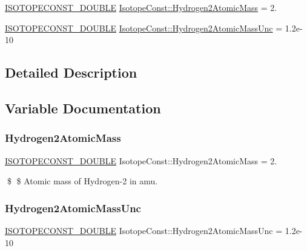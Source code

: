 \begin{DoxyCompactItemize}
\item 
\mbox{\hyperlink{group___isotope_const-_macros_ga8f45a7272ce02c0b4c65c44636ed719a}{I\+S\+O\+T\+O\+P\+E\+C\+O\+N\+S\+T\+\_\+\+D\+O\+U\+B\+LE}} \mbox{\hyperlink{group___isotope_const-_hydrogen-_h2_ga01800289e19608d2faed592d58b2feef}{Isotope\+Const\+::\+Hydrogen2\+Atomic\+Mass}} = 2.
\item 
\mbox{\hyperlink{group___isotope_const-_macros_ga8f45a7272ce02c0b4c65c44636ed719a}{I\+S\+O\+T\+O\+P\+E\+C\+O\+N\+S\+T\+\_\+\+D\+O\+U\+B\+LE}} \mbox{\hyperlink{group___isotope_const-_hydrogen-_h2_ga5e8250090a221fe05dd08a5556946386}{Isotope\+Const\+::\+Hydrogen2\+Atomic\+Mass\+Unc}} = 1.\+2e-\/10
\end{DoxyCompactItemize}


\subsection{Detailed Description}


\subsection{Variable Documentation}
\mbox{\label{group___isotope_const-_hydrogen-_h2_ga01800289e19608d2faed592d58b2feef}} 
\subsubsection{\texorpdfstring{Hydrogen2\+Atomic\+Mass}{Hydrogen2AtomicMass}}
{\footnotesize\ttfamily \mbox{\hyperlink{group___isotope_const-_macros_ga8f45a7272ce02c0b4c65c44636ed719a}{I\+S\+O\+T\+O\+P\+E\+C\+O\+N\+S\+T\+\_\+\+D\+O\+U\+B\+LE}} Isotope\+Const\+::\+Hydrogen2\+Atomic\+Mass = 2.}

\$ \$ Atomic mass of Hydrogen-\/2 in amu. \mbox{\label{group___isotope_const-_hydrogen-_h2_ga5e8250090a221fe05dd08a5556946386}} 
\subsubsection{\texorpdfstring{Hydrogen2\+Atomic\+Mass\+Unc}{Hydrogen2AtomicMassUnc}}
{\footnotesize\ttfamily \mbox{\hyperlink{group___isotope_const-_macros_ga8f45a7272ce02c0b4c65c44636ed719a}{I\+S\+O\+T\+O\+P\+E\+C\+O\+N\+S\+T\+\_\+\+D\+O\+U\+B\+LE}} Isotope\+Const\+::\+Hydrogen2\+Atomic\+Mass\+Unc = 1.\+2e-\/10}

